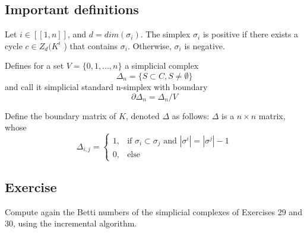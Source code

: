 \subsection{Important definitions}

\begin{definition}
    Let $i \in [[1, n]]$, and $d = dim(\sigma_i)$. The simplex $\sigma_i$ is
    positive if there exists a cycle $c \in Z_d(K^i$ ) that contains
    $\sigma_i$. Otherwise, $\sigma_i$ is negative.
\end{definition}

\begin{definition}
    Defines for a set $V = \{0,1,...,n\}$ a simplicial complex 
    $$
    \Delta_n = \{S \subset C, S \neq \emptyset\}
    $$
    and call it simplicial standard n-simplex with boundary 
    $$
    \partial \Delta_n = \Delta_n/V
    $$
\end{definition}

\begin{definition}
    Define the boundary matrix of $K$, denoted $\Delta$ as follows:
    $\Delta$ is a $n \times n$ matrix, whose 
    $$\Delta_{i,j} = \begin{cases}
    1, &\text{if }\sigma_i \subset \sigma_j \text{ and } |\sigma^i| =
    |\sigma^j| - 1 \\
    0, &\text{else} 
    \end{cases}$$
\end{definition}

\subsection{Exercise}

\begin{exercise}
    Compute again the Betti numbers of the simplicial complexes of Exercises 29 and 30, using the incremental algorithm.
\end{exercise}

